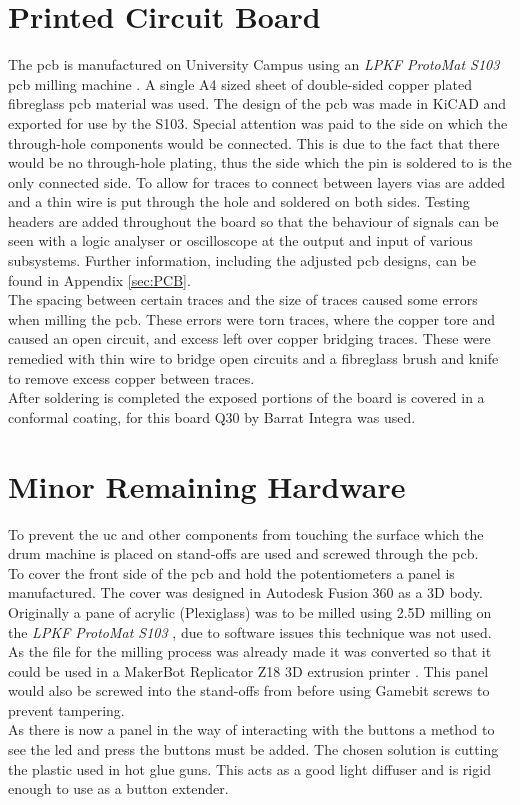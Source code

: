 \documentclass[12pt,a4paper]{report}
\begin{document}
\section{Printed Circuit Board}
The \ac{pcb} is manufactured on University Campus using an \textit{LPKF ProtoMat S103} \ac{pcb} milling machine \cite{pcbprint}. A single A4 sized sheet of double-sided copper plated fibreglass \ac{pcb} material was used. The design of the \ac{pcb} was made in KiCAD \cite{kicad} and exported for use by the S103. Special attention was paid to the side on which the through-hole components would be connected. This is due to the fact that there would be no through-hole plating, thus the side which the pin is soldered to is the only connected side. To allow for traces to connect between layers vias are added and a thin wire is put through the hole and soldered on both sides. Testing headers are added throughout the board so that the behaviour of signals can be seen with a logic analyser or oscilloscope at the output and input of various subsystems. Further information, including the adjusted \ac{pcb} designs, can be found in Appendix \ref{sec:PCB}.\\
The spacing between certain traces and the size of traces caused some errors when milling the \ac{pcb}. These errors were torn traces, where the copper tore and caused an open circuit, and excess left over copper bridging traces. These were remedied with thin wire to bridge open circuits and a fibreglass brush and knife to remove excess copper between traces. \\
After soldering is completed the exposed portions of the board is covered in a conformal coating, for this board Q30 by Barrat Integra \cite{q30} was used.
\section{Minor Remaining Hardware}
To prevent the \ac{uc} and other components from touching the surface which the drum machine is placed on stand-offs are used and screwed through the \ac{pcb}. \\
To cover the front side of the \ac{pcb} and hold the potentiometers a panel is manufactured. The cover was designed in Autodesk Fusion 360 \cite{fusion360} as a 3D body. Originally a pane of acrylic (Plexiglass) was to be milled using 2.5D milling on the \textit{LPKF ProtoMat S103} \cite{pcbprint}, due to software issues this technique was not used. As the file for the milling process was already made it was converted so that it could be used in a MakerBot Replicator Z18 3D extrusion printer \cite{makerbot}. This panel would also be screwed into the stand-offs from before using Gamebit screws to prevent tampering.\\
As there is now a panel in the way of interacting with the buttons a method to see the \ac{led} and press the buttons must be added. The chosen solution is cutting the plastic used in hot glue guns. This acts as a good light diffuser and is rigid enough to use as a button extender.
\newpage
\end{document}
